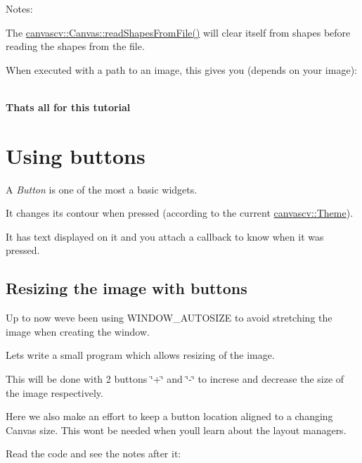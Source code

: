  Notes\+:
\begin{DoxyItemize}
\item The \hyperlink{classcanvascv_1_1Canvas_ab68000bb631c2fa7bb8863e746a8cff3}{canvascv\+::\+Canvas\+::read\+Shapes\+From\+File()} will clear itself from shapes before reading the shapes from the file.
\item When executed with a path to an image, this gives you (depends on your image)\+:  ~\newline

\end{DoxyItemize}

{\bfseries That\textquotesingle{}s all for this tutorial} \hypertarget{tutbuttons}{}\section{Using buttons}\label{tutbuttons}
A {\itshape Button} is one of the most a basic widgets.

It changes its contour when pressed (according to the current \hyperlink{classcanvascv_1_1Theme}{canvascv\+::\+Theme}).

It has text displayed on it and you attach a callback to know when it was pressed.\hypertarget{tutbuttons_buttons_s1}{}\subsection{Resizing the image with buttons}\label{tutbuttons_buttons_s1}
Up to now we\textquotesingle{}ve been using W\+I\+N\+D\+O\+W\+\_\+\+A\+U\+T\+O\+S\+I\+ZE to avoid stretching the image when creating the window.

Let\textquotesingle{}s write a small program which allows resizing of the image.

This will be done with 2 buttons \char`\"{}+\char`\"{} and \char`\"{}-\/\char`\"{} to increse and decrease the size of the image respectively.

Here we also make an effort to keep a button location aligned to a changing Canvas size. This won\textquotesingle{}t be needed when you\textquotesingle{}ll learn about the layout managers.

Read the code and see the notes after it\+:



